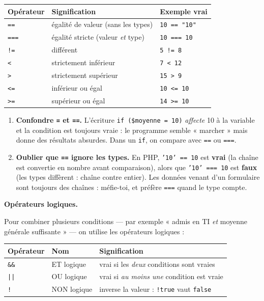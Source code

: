 \documentclass[11pt]{article}
\begin{document}
\begin{center}
\begin{tabularx}{\linewidth}{|l|X|l|}
\hline
\rowcolor{popblueL} \textbf{Opérateur} & \textbf{Signification} & \textbf{Exemple vrai} \\
\hline
\texttt{==} & égalité de valeur (sans les types) & \texttt{10 == "10"} \\
\hline
\texttt{===} & égalité stricte (valeur \emph{et} type) & \texttt{10 === 10} \\
\hline
\texttt{!=} & différent & \texttt{5 != 8} \\
\hline
\texttt{<} & strictement inférieur & \texttt{7 < 12} \\
\hline
\texttt{>} & strictement supérieur & \texttt{15 > 9} \\
\hline
\texttt{<=} & inférieur ou égal & \texttt{10 <= 10} \\
\hline
\texttt{>=} & supérieur ou égal & \texttt{14 >= 10} \\
\hline
\end{tabularx}
\end{center}

\begin{attention}
\begin{enumerate}
    \item \textbf{Confondre \texttt{=} et \texttt{==}.} L'écriture \texttt{if (\$moyenne = 10)} \emph{affecte} 10 à la variable et la condition est toujours vraie : le programme semble « marcher » mais donne des résultats absurdes. Dans un \texttt{if}, on compare avec \texttt{==} ou \texttt{===}.
    \item \textbf{Oublier que \texttt{==} ignore les types.} En PHP, \texttt{'10' == 10} est \textbf{vrai} (la chaîne est convertie en nombre avant comparaison), alors que \texttt{'10' === 10} est \textbf{faux} (les types diffèrent : chaîne contre entier). Les données venant d'un formulaire sont toujours des chaînes : méfie-toi, et préfère \texttt{===} quand le type compte.
\end{enumerate}
\end{attention}

\textbf{Opérateurs logiques.}\par
Pour combiner plusieurs conditions — par exemple « admis en TI \emph{et} moyenne générale suffisante » — on utilise les opérateurs logiques :

\begin{center}
\begin{tabularx}{\linewidth}{|l|l|X|}
\hline
\rowcolor{popblueL} \textbf{Opérateur} & \textbf{Nom} & \textbf{Signification} \\
\hline
\texttt{\&\&} & ET logique & vrai si les \emph{deux} conditions sont vraies \\
\hline
\texttt{||} & OU logique & vrai si \emph{au moins une} condition est vraie \\
\hline
\texttt{!} & NON logique & inverse la valeur : \texttt{!true} vaut \texttt{false} \\
\hline
\end{tabularx}
\end{center}
\end{document}
